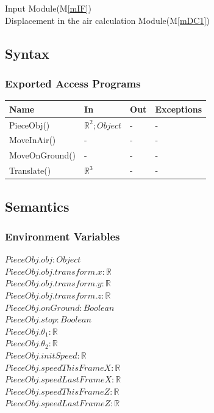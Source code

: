 \documentclass[12pt, titlepage]{article}
\newcommand{\mref}[1]{M\ref{#1}}
\begin{document}
Input Module(\mref{mIF})\\
Displacement in the air calculation Module(\mref{mDC1})\\

\subsection{Syntax}

\subsubsection{Exported Access Programs}

\begin{center}
	\begin{tabular}{p{4cm} p{4cm} p{4cm} p{2cm}}
		\hline
		\textbf{Name} & \textbf{In} & \textbf{Out} & \textbf{Exceptions} \\
		\hline		
		PieceObj() & $\mathbb{R}^{2};Object$ & - & - \\
		MoveInAir() & - & - & - \\
		MoveOnGround() & - & - & - \\
		Translate() & $\mathbb{R}^{3}$ & - & - \\
		\hline
	\end{tabular}
\end{center}

\subsection{Semantics}

\subsubsection{Environment Variables}

$PieceObj.obj: Object$\\
$PieceObj.obj.transform.x: \mathbb{R}$\\
$PieceObj.obj.transform.y: \mathbb{R}$\\
$PieceObj.obj.transform.z: \mathbb{R}$\\
$PieceObj.onGround: Boolean$\\
$PieceObj.stop: Boolean$\\
$PieceObj.\theta_{1}: \mathbb{R}$\\
$PieceObj.\theta_{2}: \mathbb{R}$\\
$PieceObj.initSpeed: \mathbb{R}$\\
$PieceObj.speedThisFrameX: \mathbb{R}$\\
$PieceObj.speedLastFrameX: \mathbb{R}$\\
$PieceObj.speedThisFrameZ: \mathbb{R}$\\
$PieceObj.speedLastFrameZ: \mathbb{R}$
\end{document}
